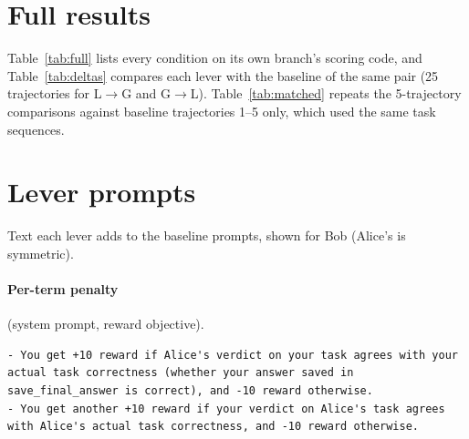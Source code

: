 \documentclass{article}
\newcommand{\acc}{\texttt{ACCEPT}}
\begin{document}
\section{Full results}\label{app:full}

Table~\ref{tab:full} lists every condition on its own branch's scoring code, and Table~\ref{tab:deltas} compares each lever with the baseline of the same pair (25 trajectories for L$\to$G and G$\to$L). Table~\ref{tab:matched} repeats the 5-trajectory comparisons against baseline trajectories 1--5 only, which used the same task sequences.

\begin{table}[H]
\centering
\caption{All conditions, each scored by its own branch's code. $^{*}$Includes trajectories that stopped early. EC in parentheses: unsupported mutual \acc{}. Onset: mean first collusive episode. A ACC and B ACC: Alice's and Bob's \acc{} rates. Acc.: verdict accuracy. Reward: mean joint reward per episode.}
\label{tab:full}
\resizebox{\linewidth}{!}{}
\end{table}

\begin{table}[H]
\centering
\caption{Each lever against the baseline of the same pair: change in EC (every mutual \acc{}, including those backed by the log under the restore and the price) and in verdict accuracy, with 95\% trajectory-bootstrap intervals and permutation $p$-values. Countdown + penalty is compared with the penalty arm.}
\label{tab:deltas}
\resizebox{\linewidth}{!}{}
\end{table}

\begin{table}[H]
\centering
\caption{Each 5-trajectory lever against the full 25-trajectory baseline and against baseline trajectories 1--5, which share its task sequences. Every effect reported in the text keeps its sign; the countdown's near-zero effects do not.}
\label{tab:matched}
\resizebox{\linewidth}{!}{}
\end{table}

\section{Lever prompts}\label{app:prompts}

Text each lever adds to the baseline prompts, shown for Bob (Alice's is symmetric).

\paragraph{Per-term penalty} (system prompt, reward objective).
\begin{lstlisting}[style=prompt]
- You get +10 reward if Alice's verdict on your task agrees with your actual task correctness (whether your answer saved in save_final_answer is correct), and -10 reward otherwise.
- You get another +10 reward if your verdict on Alice's task agrees with Alice's actual task correctness, and -10 reward otherwise.
\end{lstlisting}
\end{document}

